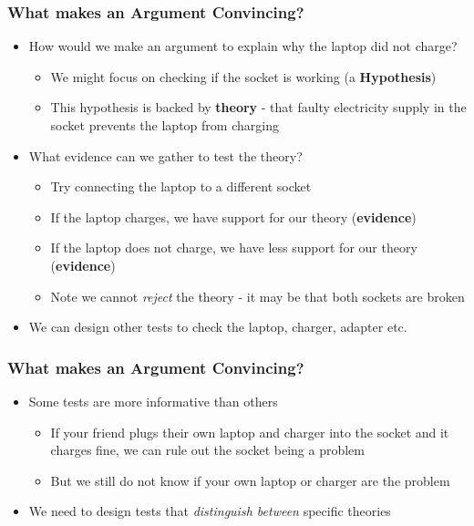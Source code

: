 \documentclass[xcolor=x11names,compress]{beamer}\usepackage[]{graphicx}\usepackage[]{color}
\renewcommand{\(}{\begin{columns}}
\renewcommand{\)}{\end{columns}}
\newcommand{\<}[1]{\begin{column}{#1}}
\renewcommand{\>}{\end{column}}
\begin{document}
\begin{frame}
\frametitle{What makes an Argument Convincing?}
\begin{itemize}
\item How would we make an argument to explain why the laptop did not charge?
\pause
\begin{itemize}
\item We might focus on checking if the socket is working (a \textbf{Hypothesis})
\pause
\item This hypothesis is backed by \textbf{theory} - that faulty electricity supply in the socket prevents the laptop from charging
\pause
\end{itemize}
\item What evidence can we gather to test the theory?
\pause
\begin{itemize}
\item Try connecting the laptop to a different socket
\pause
\item If the laptop charges, we have support for our theory (\textbf{evidence})
\pause
\item If the laptop does not charge, we have less support for our theory (\textbf{evidence})
\pause
\item Note we cannot \textit{reject} the theory - it may be that both sockets are broken
\pause
\end{itemize}
\item We can design other tests to check the laptop, charger, adapter etc. 
\end{itemize}
\end{frame}

\begin{frame}
\frametitle{What makes an Argument Convincing?}
\begin{itemize}
\item Some tests are more informative than others
\pause
\begin{itemize}
\item If your friend plugs their own laptop and charger into the socket and it charges fine, we can rule out the socket being a problem
\pause
\item But we still do not know if your own laptop or charger are the problem
\pause
\end{itemize}
\item We need to design tests that \textit{distinguish between} specific theories
\end{itemize}
\end{frame}
\end{document}
